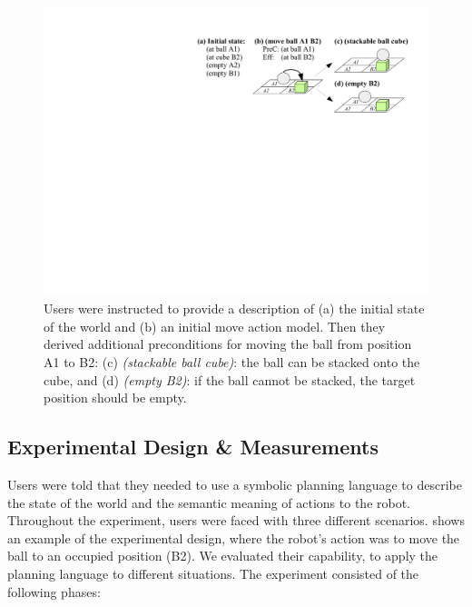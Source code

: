  \begin{figure}[h]
 	\centering
 	\includegraphics[width=0.75\linewidth]{figures/scenarios-exp1}
 	\caption{Users were instructed to provide a description of (a) the initial state of the world and (b) an initial move action model.
 		Then they derived additional preconditions for moving the ball from position A1 to B2: (c) \textit{(stackable ball cube)}: the ball can be stacked onto the cube, and (d) \textit{(empty B2)}: if the ball cannot be stacked, the target position should be empty.}
 	\label{fig:scenarios-exp1}
 \end{figure}

\subsection{Experimental Design \& Measurements}
Users were told that they needed to use a symbolic planning language to describe the state of the world and the semantic meaning of actions to the robot. 
Throughout the experiment, users were faced with three different scenarios. 
 shows an example of the experimental design, where the robot's action was to move the ball to an occupied position (B2). 
We evaluated their capability, to apply the planning language to different situations.
The experiment consisted of the following phases:

